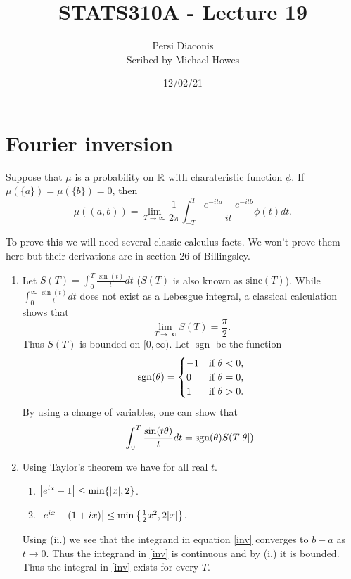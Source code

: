 

\DeclareMathOperator*{\sgn}{sgn}


\title{STATS310A - Lecture 19}
\author{Persi Diaconis\\ Scribed by Michael Howes}
\date{12/02/21}

\pagestyle{fancy}
\fancyhf{}


\maketitle
\tableofcontents
\section{Fourier inversion}
\begin{thrm}
    Suppose that $\mu$ is a probability on ${\mathbb R}$ with charateristic function $\phi$. If $\mu(\{a\})=\mu(\{b\})=0$, then 
    \begin{equation}\label{inv}\mu((a,b)) = \lim_{T \to \infty} \frac{1}{2\pi}\int_{-T}^T \frac{e^{-ita}-e^{-itb}}{it}\phi(t)dt.
    \end{equation}
\end{thrm}
To prove this we will need several classic calculus facts. We won't prove them here but their derivations are in section 26 of Billingsley. 
\begin{enumerate}
    \item Let $S(T) = \int_0^T \frac{\sin(t)}{t}dt$ ($S(T)$ is also known as $\text{sinc}(T)$). While $\int_0^\infty \frac{\sin(t)}{t}dt$ does not exist as a Lebesgue integral, a classical calculation shows that 
    \[\lim_{T \to \infty} S(T)=\frac{\pi}{2}.  \]
    Thus $S(T)$ is bounded on $[0,\infty)$. Let $\sgn$ be the function 
    \[\sgn(\ta) =\begin{cases}
        -1 & \text{if } \ta < 0,\\
        0 & \text{if } \ta=0,\\
        1 & \text{if } \ta > 0.
    \end{cases} \]
    By using a change of variables, one can show that 
    \begin{equation}\label{sinc}\int_0^T \frac{\sin(t\ta)}{t}dt = \sgn(\ta)S(T\abs{\ta}).\end{equation}
    \item Using Taylor's theorem we have for all real $t$.
    \begin{enumerate}
        \item ${\left\lvert e^{ix}-1\right\rvert}\le\min\{{\left\lvert x\right\rvert},2\}$.
        \item ${\left\lvert e^{ix}-(1+ix)\right\rvert}\le \min\left\{\frac{1}{2}x^2,2{\left\lvert x\right\rvert}\right\}$.
    \end{enumerate}
    Using (ii.) we see that the integrand in equation \eqref{inv} converges to $b-a$ as $t \to 0$. Thus the integrand in \eqref{inv} is continuous and by (i.) it is bounded. Thus the integral in \eqref{inv} exists for every $T$.
\end{enumerate}
